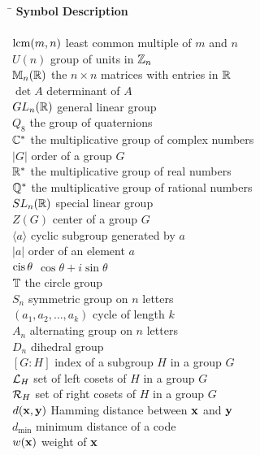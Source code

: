 \begin{tabbing}
\hspace{1.9775in} \= \kill
{\bf Symbol}  \>  {\bf Description} \\
     \mbox{\hspace*{1in}} \\
$\operatorname{lcm}(m,n)$ \>  least common multiple of $m$ and $n$ \\
$U(n)$ \>  group of units in ${\Bbb Z}_n$ \\
${\Bbb M}_n ( {\Bbb R})$ \>  the $n \times n$ matrices with entries in
     ${\Bbb R}$ \\
$\det A$ \>  determinant of $A$ \\
$GL_n({\Bbb R})$ \>  general linear group \\
$Q_8$ \>  the group of quaternions \\
${\Bbb C}^\ast$ \>  the multiplicative group of complex numbers \\
$|G|$ \>  order of a group $G$ \\
${\Bbb R}^*$ \>  the multiplicative group of real numbers \\
${\Bbb Q}^*$ \>  the multiplicative group of rational numbers \\
$SL_n({\Bbb R})$ \>  special linear group \\
$Z(G)$ \>  center of a group $G$ \\
$\langle a \rangle$ \>  cyclic subgroup generated by $a$ \\
$|a|$ \>  order of an element $a$ \\
$\operatorname{cis} \theta$ \>  $\cos \theta + i \sin \theta$ \\
${\Bbb T}$ \>  the circle group \\
$S_n$ \>  symmetric group on $n$ letters \\
$(a_1, a_2, \ldots, a_k )$ \>  cycle of length $k$ \\
$A_n$ \>  alternating group on $n$ letters \\
$D_n$ \>  dihedral group \\
$[G:H]$ \>  index of a subgroup $H$ in a group $G$ \\
${\cal L}_H$ \>  set of left cosets of $H$ in a group $G$ \\
${\cal R}_H$ \>  set of right cosets of $H$ in a group $G$ \\
$d({\bold x}, {\bold y})$ \>  Hamming distance between ${\bold x}$ and
     ${\bold y}$ \\
$d_{\min}$ \>  minimum distance of a code \\
$w({\bold x})$ \>  weight of ${\bold x}$ \\

\end{tabbing}
